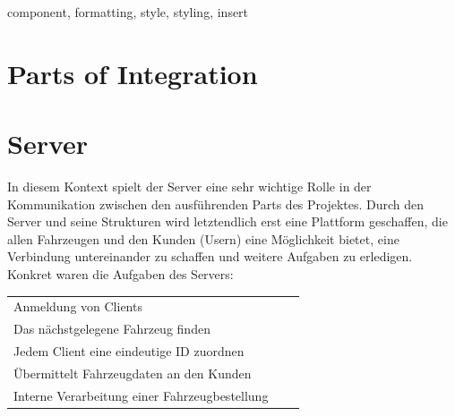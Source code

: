 \documentclass[conference]{IEEEtran}
\begin{document}
\begin{IEEEkeywords}
component, formatting, style, styling, insert
\end{IEEEkeywords}
\section{Parts of Integration}
\section{Server}
In diesem Kontext spielt der Server eine sehr wichtige Rolle in der Kommunikation zwischen den ausführenden Parts des Projektes. Durch den Server und seine Strukturen wird letztendlich erst eine Plattform geschaffen, die allen Fahrzeugen und den Kunden (Usern) eine Möglichkeit bietet, eine Verbindung untereinander zu schaffen und weitere Aufgaben zu erledigen. Konkret waren die Aufgaben des Servers: 
\begin{table}[h]
\begin{tabular}{lcr}
Anmeldung von Clients\\
Das nächstgelegene Fahrzeug finden\\
Jedem Client eine eindeutige ID zuordnen \\
Übermittelt Fahrzeugdaten an den Kunden\\
Interne Verarbeitung einer Fahrzeugbestellung\\
\end{tabular}
\end{table}
\end{document}
